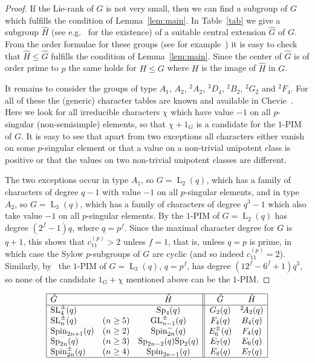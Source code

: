 \documentclass{ert-l}
\newcommand{\GL}{{\operatorname{GL}}}
\newcommand{\PSL}{{\operatorname{L}}}
\newcommand{\SL}{{\operatorname{SL}}}
\newcommand{\Sp}{{\operatorname{Sp}}}
\newcommand{\Spin}{{\operatorname{Spin}}}
\newcommand{\tw}[1]{{}^{#1}\!}
\newcommand{\Chevie}{{\sf Chevie}}
\theoremstyle{remark}
\begin{document}
\begin{proof}
If the Lie-rank of $G$ is not very small, then we can find a subgroup of $G$
which fulfills the condition of Lemma~\ref{lem:main}. In Table~\ref{tab} we
give a subgroup $\hat H$ (see e.g.~\cite[\S13]{MT} for the existence) of a
suitable central extension $\hat G$ of $G$.  From the order formulae for 
these groups (see for example~\cite[Tab.~24.1]{MT})
it is easy to check that $\hat H \leq \hat G$ fulfills the condition of
Lemma~\ref{lem:main}. Since the center of $\hat G$ is of order prime to $p$
the same holds for $H \leq G$ where $H$ is the image of $\hat H$ in $G$.

It remains to consider the groups of type $A_1$, $A_2$, $\tw2A_2$,
$\tw3D_4$, $\tw2B_2$, $\tw2G_2$ and $\tw2F_4$.  For all of these the
(generic) character tables are known and available in \Chevie~\cite{Chv}. 
Here we look for all irreducible characters $\chi$ which have value $-1$ on all
$p$-singular (non-semisimple) elements, so that $\chi+1_G$ is a candidate
for the $1$-PIM of $G$.
It is easy to see that apart from two exceptions all characters either
vanish on some $p$-singular element or that a value on a non-trivial
unipotent class is positive or that the values on two non-trivial 
unipotent classes are different.

The two exceptions occur in type $A_1$, so $G = \PSL_2(q)$, which has a
family of characters of degree $q-1$ with value $-1$ on all $p$-singular
elements,
and in type $A_2$, so $G = \PSL_3(q)$, which has a family of characters
of degree $q^3-1$ which also take value $-1$ on all $p$-singular elements.
By \cite[Thm.~5.2]{MW08} the $1$-PIM of $G=\PSL_2(q)$ has degree $(2^f-1)q$,
where $q=p^f$. Since the maximal character degree for $G$ is $q+1$, this
shows that $c_{11}^{(p)}>2$ unless $f=1$, that is, unless $q=p$ is prime, in
which case the Sylow $p$-subgroups of $G$ are cyclic (and so indeed
$c_{11}^{(p)}=2$). 
Similarly, by~\cite[Thm.~5.3]{MW08} the $1$-PIM of $G=\PSL_3(q)$, $q=p^f$,
has degree $(12^f-6^f+1)q^3$, so none of the candidate $1_G+\chi$ mentioned
above can be the $1$-PIM.
\end{proof}

\begin{table}[htbp]
 \caption{Large subgroups}   \label{tab}
\[\begin{array}{|llc||cc|}
\hline
     \hat G&& \hat H&  \hat G& \hat H\cr
\hline
 \SL_4^\pm(q)&& \Sp_4(q)&                   G_2(q)& \tw2A_2(q)\\
 \SL_n^\pm(q)& (n\ge5)& \GL_{n-1}^\pm(q)&   F_4(q)& B_4(q)\\
 \Spin_{2n+1}(q)& (n\ge2)& \Spin_{2n}^-(q)&    E^\pm_6(q)& F_4(q)\\
 \Sp_{2n}(q)& (n\ge3)& \Sp_{2n-2}(q)\Sp_2(q)&      E_7(q)& E_6(q)\\
 \Spin_{2n}^\pm(q)& (n\ge4)& \Spin_{2n-1}(q)&  E_8(q)& E_7(q)\\
\hline
\end{array}\]
\end{table}
\end{document}
